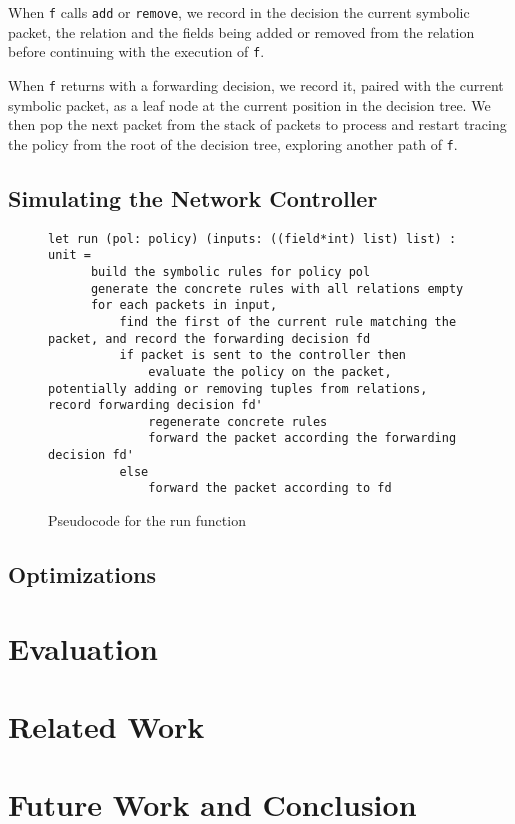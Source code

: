 \documentclass[12pt]{article}
\begin{document}
When \lstinline|f| calls \lstinline|add| or \lstinline|remove|, we record in the decision the current symbolic packet, the relation and the fields being added or removed from the relation before continuing with the execution of \lstinline|f|.

When \lstinline|f| returns with a forwarding decision, we record it, paired with the current symbolic packet, as a leaf node at the current position in the decision tree. We then pop the next packet from the stack of packets to process and restart tracing the policy from the root of the decision tree, exploring another path of \lstinline|f|.  


\subsection*{Simulating the Network Controller}

\begin{figure}
\begin{lstlisting}
let run (pol: policy) (inputs: ((field*int) list) list) : unit =
      build the symbolic rules for policy pol
      generate the concrete rules with all relations empty
      for each packets in input,
          find the first of the current rule matching the packet, and record the forwarding decision fd
          if packet is sent to the controller then
              evaluate the policy on the packet, potentially adding or removing tuples from relations, record forwarding decision fd'
              regenerate concrete rules
              forward the packet according the forwarding decision fd'
          else
              forward the packet according to fd 
\end{lstlisting}

\caption{Pseudocode for the run function}
  \end{figure}



\subsection*{Optimizations}


\section*{Evaluation}


\section*{Related Work}


\section*{Future Work and Conclusion}




\end{document}
